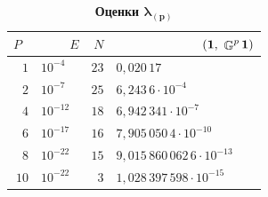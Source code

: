 \begin{table}[h!]

\centering

\begin{minipage}{8cm}



\centering



\small

\caption{\bf Оценка итераций оператора Грина} \vspace{-3mm}

\centering

\begin{tabular}{r|l|r|l}

            \hline

            \footnotesize $P$~& \footnotesize ~~~~$E$& \footnotesize $N$& \footnotesize ~~~~~~~~~~~~$\left({\mathbf{1}},\ {\mathop{\mathbb{G}}\nolimits^p\mathbf{1}}\right)$\\

            \hline

            \rule{0mm}{12pt}%

            $1$&$10^{-4}$&$23$&$0,020\,17$\\

            $2$&$10^{-7}$&$25$&$6,243\,6\cdot10^{-4}$\\

            $4$&$10^{-12}$&$18$&$6,942\,341\cdot10^{-7}$\\

            $6$&$10^{-17}$&$16$&$7,905\,050\,4\cdot10^{-10}$\\

            $8$&$10^{-22}$&$15$&$9,015\,860\,062\,6\cdot10^{-13}$\\

            $10$&$10^{-22}$&$3$&$1,028\,397\,598\cdot10^{-15}$\\

            \hline

\end{tabular}

\label{kuzn:tab-green}



\vspace{5mm}



\small

\caption{\bf Оценки $\boldsymbol{\lambda_{(p)}}$} \vspace{-3mm}

\centering


\end{minipage}
\end{table}
